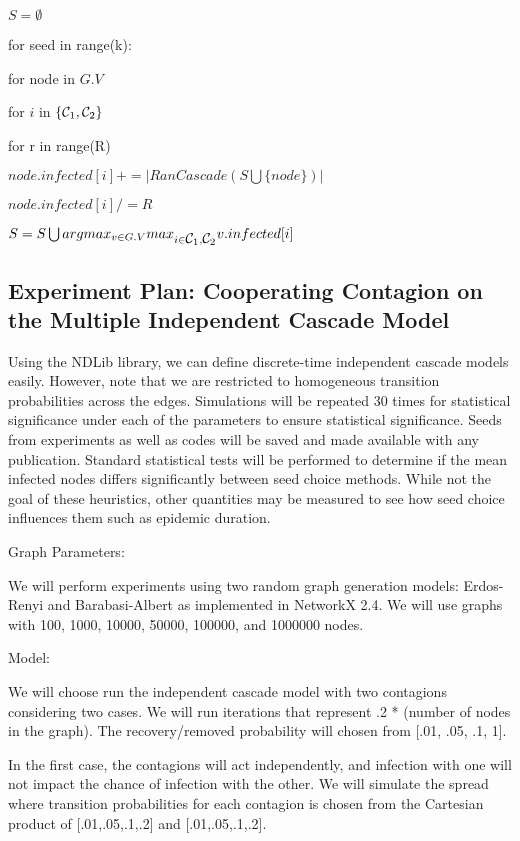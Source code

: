 \documentclass[11pt]{article}
\begin{document}
$S = \emptyset$

for seed in range(k):

\indent\indent for node in $G.V$

\indent\indent\indent for $i$ in $\{\mbox{$\mathcal{C}_1$}{}, \mbox{$\mathcal{C}_2$}{}\}$

\indent\indent\indent\indent for r in range(R)

\indent\indent\indent\indent\indent $node.infected[i] += |RanCascade(S \bigcup \{node\})|$ 

\indent\indent\indent\indent $node.infected[i] /= R$

\indent\indent\indent $S = S \bigcup argmax_{v\in G.V}max_{i\in\mbox{$\mathcal{C}_1$}{}, \mbox{$\mathcal{C}_2$}{}} v.infected[i]$ 

\subsection{Experiment Plan: Cooperating Contagion on the Multiple Independent Cascade Model}
Using the NDLib library, we can define discrete-time independent cascade models easily. However, note that we are restricted to homogeneous transition probabilities across the edges. Simulations will be repeated 30 times for statistical significance under each of the parameters to ensure statistical significance. Seeds from experiments as well as codes will be saved and made available with any publication. Standard statistical tests will be performed to determine if the mean infected nodes differs significantly between seed choice methods. While not the goal of these heuristics, other quantities may be measured to see how seed choice influences them such as epidemic duration. 


Graph Parameters:

We will perform experiments using two random graph generation models: Erdos-Renyi and Barabasi-Albert as implemented in NetworkX 2.4. 
We will use graphs with 100, 1000, 10000, 50000, 100000, and 1000000 nodes.


Model:


We will choose run the independent cascade model with two contagions considering two cases. We will run iterations that represent .2 * (number of nodes in the graph). The recovery/removed probability will chosen from [.01, .05, .1, 1].


In the first case, the contagions will act independently, and infection with one will not impact the chance of infection with the other. We will simulate the spread where transition probabilities for each contagion is chosen from the Cartesian product of [.01,.05,.1,.2] and [.01,.05,.1,.2].  
\end{document}
